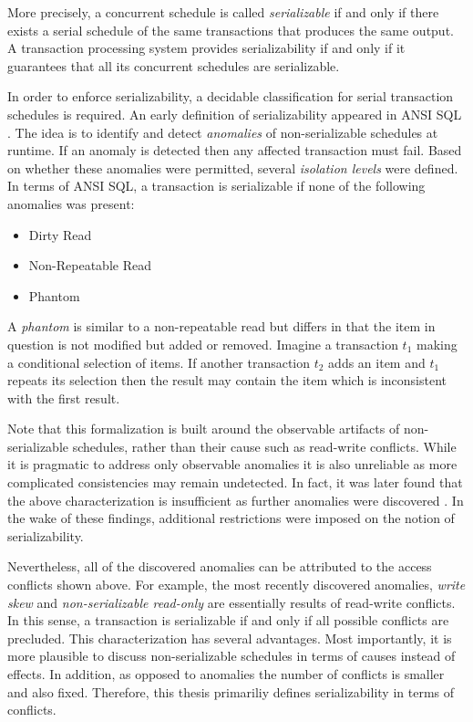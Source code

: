 More precisely, a concurrent schedule is called \emph{serializable} if and only
if there exists a serial schedule of the same transactions that produces the
same output. A transaction processing system provides serializability if and
only if it guarantees that all its concurrent schedules are serializable.


In order to enforce serializability, a decidable classification for serial
transaction schedules is required. An early definition of serializability
appeared in ANSI SQL \cite{ansi1992sql, melton1993understanding}. The idea
is to identify and detect \emph{anomalies} of non-serializable schedules at
runtime. If an anomaly is detected then any affected transaction must fail.
Based on whether these anomalies were permitted, several \emph{isolation levels}
were defined. In terms of ANSI SQL, a transaction is serializable if none of the
following anomalies was present:

\begin{itemize}
    \item Dirty Read
    \item Non-Repeatable Read
    \item Phantom
\end{itemize}

A \emph{phantom} is similar to a non-repeatable read but differs in that the
item in question is not modified but added or removed. Imagine a transaction
$t_1$ making a conditional selection of items. If another transaction $t_2$ adds
an item and $t_1$ repeats its selection then the result may contain the item
which is inconsistent with the first result.

Note that this formalization is built around the observable artifacts of
non-serializable schedules, rather than their cause such as read-write
conflicts. While it is pragmatic to address only observable anomalies it is also
unreliable as more complicated consistencies may remain undetected. In fact, it
was later found that the above characterization is insufficient as further
anomalies were discovered \cite{berenson1995critique, fekete2004read}. In the
wake of these findings, additional restrictions were imposed on the notion of
serializability.

Nevertheless, all of the discovered anomalies can be attributed to the access
conflicts shown above. For example, the most recently discovered anomalies,
\emph{write skew} and \emph{non-serializable read-only} are essentially results
of read-write conflicts. In this sense, a transaction is serializable if and
only if all possible conflicts are precluded. This characterization has several
advantages. Most importantly, it is more plausible to discuss non-serializable
schedules in terms of causes instead of effects. In addition, as opposed to
anomalies the number of conflicts is smaller and also fixed. Therefore, this
thesis primariliy defines serializability in terms of conflicts.

